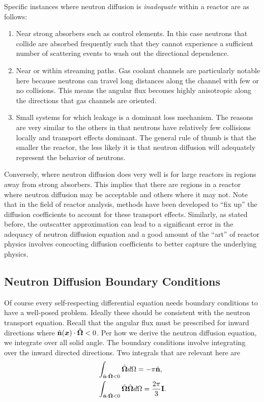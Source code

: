 Specific instances where neutron diffusion is \emph{inadequate} within a reactor are as follows:
\begin{enumerate}
  \item Near strong absorbers such as control elements. In this case neutrons that collide are absorbed frequently such that they cannot experience a sufficient number of scattering events to wash out the directional dependence.
  \item Near or within streaming paths. Gas coolant channels are particularly notable here because neutrons can travel long distances along the channel with few or no collisions. This means the angular flux becomes highly anisotropic along the directions that gas channels are oriented.
  \item Small systems for which leakage is a dominant loss mechanism. The reasons are very similar to the others in that neutrons have relatively few collisions locally and transport effects dominant. The general rule of thumb is that the smaller the reactor, the less likely it is that neutron diffusion will adequately represent the behavior of neutrons.
\end{enumerate}

Conversely, where neutron diffusion does very well is for large reactors in regions away from strong absorbers. This implies that there are regions in a reactor where neutron diffusion may be acceptable and others where it may not. Note that in the field of reactor analysis, methods have been developed to ``fix up'' the diffusion coefficients to account for these transport effects. Similarly, as stated before, the outscatter approximation can lead to a significant error in the adequacy of neutron diffusion equation and a good amount of the ``art'' of reactor physics involves concocting diffusion coefficients to better capture the underlying physics.

\subsection{Neutron Diffusion Boundary Conditions}

Of course every self-respecting differential equation needs boundary conditions to have a well-posed problem. Ideally these should be consistent with the neutron transport equation. Recall that the angular flux must be prescribed for inward directions where $\hat{\mathbf{n}}(\bm{x}) \cdot \hat{\mathbf{\Omega}} < 0$. Per how we derive the neutron diffusion equation, we integrate over all solid angle. The boundary conditions involve integrating over the inward directed directions. Two integrals that are relevant here are
\begin{subequations}
\begin{align}
  &\int_{\hat{\mathbf{n}} \cdot \hat{\mathbf{\Omega}} < 0} \hat{\mathbf{\Omega}} d\Omega = -\pi \hat{\mathbf{n}} , \\
  &\int_{\hat{\mathbf{n}} \cdot \hat{\mathbf{\Omega}} < 0} \hat{\mathbf{\Omega}} \hat{\mathbf{\Omega}} d\Omega = \frac{2\pi}{3} \mathbf{I} .
\end{align}
\end{subequations}

